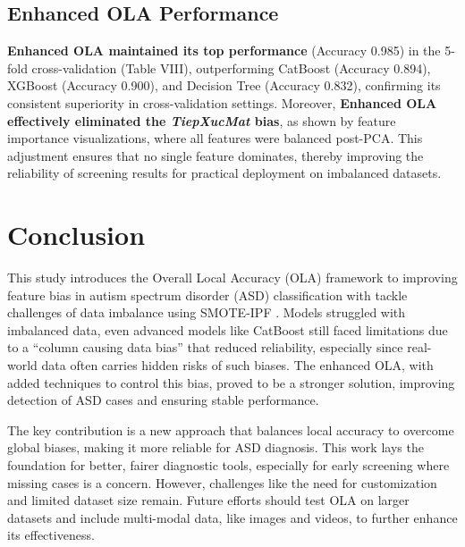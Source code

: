 \documentclass[conference]{IEEEtran}
\begin{document}
\subsection{Enhanced OLA Performance} \textbf{Enhanced OLA maintained its top performance} (Accuracy 0.985) in the 5-fold cross-validation (Table VIII), outperforming CatBoost (Accuracy 0.894), XGBoost (Accuracy 0.900), and Decision Tree (Accuracy 0.832), confirming its consistent superiority in cross-validation settings. Moreover, \textbf{Enhanced OLA effectively eliminated the \textit{TiepXucMat} bias}, as shown by feature importance visualizations, where all features were balanced post-PCA. This adjustment ensures that no single feature dominates, thereby improving the reliability of screening results for practical deployment on imbalanced datasets.

\section{Conclusion}

This study introduces the Overall Local Accuracy (OLA) framework to improving feature bias in autism spectrum disorder (ASD) classification with tackle challenges of data imbalance using SMOTE-IPF . Models struggled with imbalanced data, even advanced models like CatBoost still faced limitations due to a ``column causing data bias'' that reduced reliability, especially since real-world data often carries hidden risks of such biases. The enhanced OLA, with added techniques to control this bias, proved to be a stronger solution, improving detection of ASD cases and ensuring stable performance.

The key contribution is a new approach that balances local accuracy to overcome global biases, making it more reliable for ASD diagnosis. This work lays the foundation for better, fairer diagnostic tools, especially for early screening where missing cases is a concern. However, challenges like the need for customization and limited dataset size remain. Future efforts should test OLA on larger datasets and include multi-modal data, like images and videos, to further enhance its effectiveness.
\end{document}
